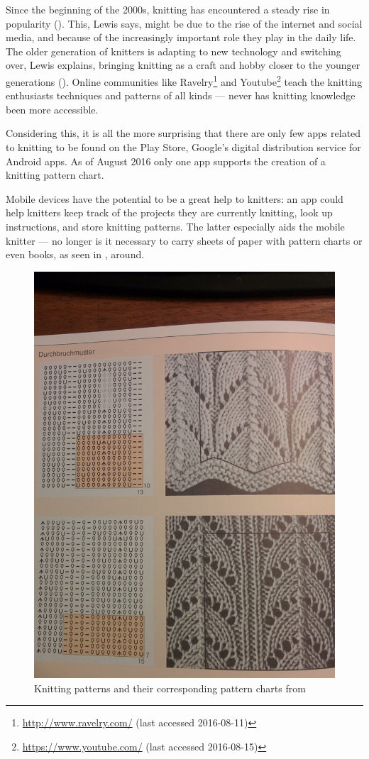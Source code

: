 Since the beginning of the 2000s, knitting has encountered a steady rise in popularity (\cite{lewis_rise_of_knitting}). This, Lewis says, might be due to the rise of the internet and social media, and because of the increasingly important role they play in the daily life. The older generation of knitters is adapting to new technology and switching over, Lewis explains, bringing knitting as a craft and hobby closer to the younger generations (\cite{lewis_rise_of_knitting}). Online communities like Ravelry\footnote{\url{http://www.ravelry.com/} (last accessed 2016-08-11)} and Youtube\footnote{\url{https://www.youtube.com/} (last accessed 2016-08-15)} teach the knitting enthusiasts techniques and patterns of all kinds --- never has knitting knowledge been more accessible.

Considering this, it is all the more surprising that there are only few apps related to knitting to be found on the Play Store, Google's digital distribution service for Android apps. As of August 2016 only one app supports the creation of a knitting pattern chart. 

Mobile devices have the potential to be a great help to knitters: an app could help knitters keep track of the projects they are currently knitting, look up instructions, and store knitting patterns. The latter especially aids the mobile knitter --- no longer is it necessary to carry sheets of paper with pattern charts or even books, as seen in , around.

\begin{figure}[H]
	\centering
    \includegraphics[width=.45\textwidth]{images/knitting_pattern_chart_book.jpg}
   \caption[{Knitting patterns and their corresponding pattern charts \protect{}}]{Knitting patterns and their corresponding pattern charts from \protect\cite[p142]{Natter1983}}
   \label{fig:knitting_book}
\end{figure}


